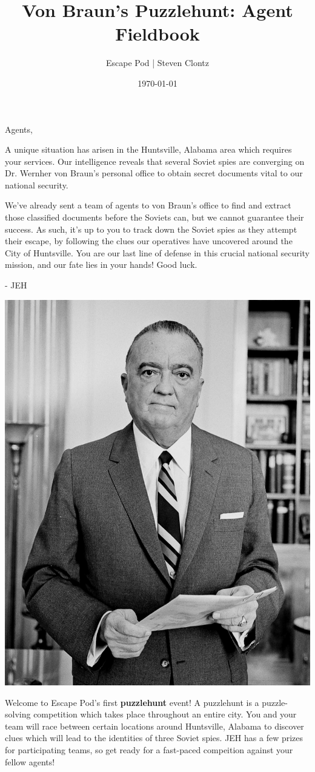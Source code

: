 \documentclass{puzzlehunt}
\title{Von Braun's Puzzlehunt: Agent Fieldbook}
\author{Escape Pod | Steven Clontz}
\date{\today}
\begin{document}
\frontmatter %

\phTitlePage %


\mainmatter %




\noindent Agents,

A unique situation has arisen in the Huntsville, Alabama area which requires
your services. Our intelligence reveals that several Soviet spies are converging
on Dr. Wernher von Braun's personal office to obtain secret documents vital to
our national security.

We've already sent a team of agents to von Braun's office to find and extract
those classified documents before the Soviets can, but we cannot guarantee
their success. As such, it's up to you to track down the Soviet spies as they
attempt their escape, by following the clues our operatives have uncovered
around the City of Huntsville. You are our last line of defense in this crucial
national security mission, and our fate lies in your hands! Good luck.

- JEH

\begin{center}
  \includegraphics[width=.5\linewidth]{jeh.jpg}
\end{center}


Welcome to Escape Pod's first \textbf{puzzlehunt} event! A puzzlehunt
is a puzzle-solving competition which takes place throughout an entire city.
You and your team will race between certain locations around Huntsville,
Alabama to discover clues
which will lead to the identities of three Soviet spies. JEH has a
few prizes for participating teams, so get ready for a fast-paced compeition
against your fellow agents!
\end{document}
